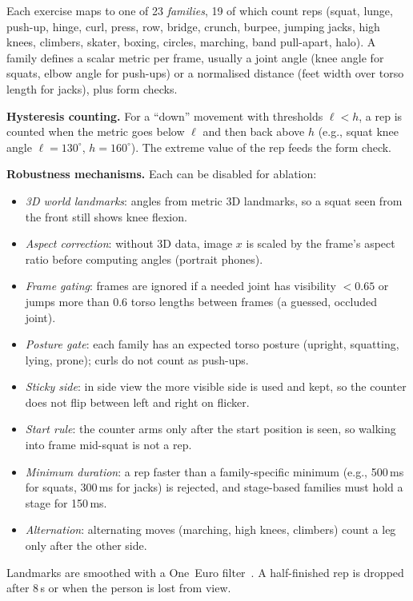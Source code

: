 \documentclass[conference]{IEEEtran}
\begin{document}
Each exercise maps to one of 23 \emph{families}, 19 of which count reps (squat, lunge, push-up, hinge,
curl, press, row, bridge, crunch, burpee, jumping jacks, high knees, climbers, skater,
boxing, circles, marching, band pull-apart, halo). A family defines a scalar metric per frame, usually a joint angle
(knee angle for squats, elbow angle for push-ups) or a normalised distance (feet width
over torso length for jacks), plus form checks.

\textbf{Hysteresis counting.} For a ``down'' movement with thresholds $\ell < h$, a rep
is counted when the metric goes below $\ell$ and then back above $h$ (e.g., squat knee
angle $\ell=130^\circ$, $h=160^\circ$). The extreme value of the rep feeds the form check.

\textbf{Robustness mechanisms.} Each can be disabled for ablation:
\begin{itemize}
\item \emph{3D world landmarks}: angles from metric 3D landmarks, so a squat seen from
the front still shows knee flexion.
\item \emph{Aspect correction}: without 3D data, image $x$ is scaled by the frame's aspect
ratio before computing angles (portrait phones).
\item \emph{Frame gating}: frames are ignored if a needed joint has visibility $<0.65$ or
jumps more than 0.6 torso lengths between frames (a guessed, occluded joint).
\item \emph{Posture gate}: each family has an expected torso posture (upright, squatting,
lying, prone); curls do not count as push-ups.
\item \emph{Sticky side}: in side view the more visible side is used and kept, so the
counter does not flip between left and right on flicker.
\item \emph{Start rule}: the counter arms only after the start position is seen, so
walking into frame mid-squat is not a rep.
\item \emph{Minimum duration}: a rep faster than a family-specific minimum (e.g., 500\,ms
for squats, 300\,ms for jacks) is rejected, and stage-based families must hold a stage
for 150\,ms.
\item \emph{Alternation}: alternating moves (marching, high knees, climbers) count a leg only after
the other side.
\end{itemize}
Landmarks are smoothed with a One~Euro filter~\cite{casiez2012oneeuro}. A half-finished
rep is dropped after 8\,s or when the person is lost from view.
\end{document}
